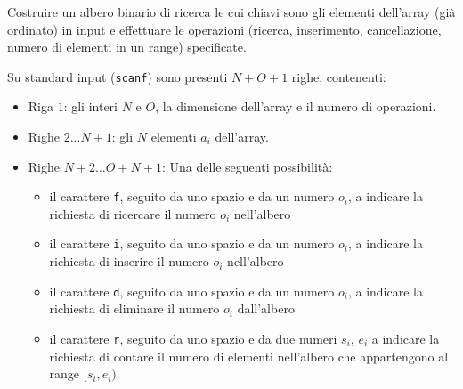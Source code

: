 \usepackage{xcolor}
\usepackage{afterpage}
\usepackage{pifont,mdframed}
\usepackage[bottom]{footmisc}


\renewcommand{\inputfile}{\texttt{stdin}}
\renewcommand{\outputfile}{\texttt{stdout}}
\makeatletter
\renewcommand{\this@inputfilename}{\texttt{stdin}}
\renewcommand{\this@outputfilename}{\texttt{stdout}}
\makeatother


\newenvironment{warning}
  {\par\begin{mdframed}[linewidth=2pt,linecolor=gray]%
    \begin{list}{}{\leftmargin=1cm
                   \labelwidth=\leftmargin}\item[\Large\ding{43}]}
  {\end{list}\end{mdframed}\par}


Costruire un albero binario di ricerca le cui chiavi sono gli elementi
dell'array (già ordinato) in input e effettuare le operazioni (ricerca,
inserimento, cancellazione, numero di elementi in un range) specificate.



\InputFile
Su standard input (\texttt{scanf}) sono presenti $N+O+1$ righe, contenenti:
\begin{itemize}[nolistsep,itemsep=2mm]
\item Riga $1$: gli interi $N$ e $O$, la dimensione dell'array e il numero di
    operazioni.
\item Righe $2...N+1$: gli $N$ elementi $a_i$ dell'array.
\item Righe $N+2...O+N+1$: Una delle seguenti possibilità:
    \begin{itemize}
        \item il carattere \texttt{f}, seguito da uno spazio e da
        un numero $o_i$, a indicare la richiesta di ricercare il numero $o_i$
        nell'albero
        \item il carattere \texttt{i}, seguito da uno spazio e da
        un numero $o_i$, a indicare la richiesta di inserire il numero $o_i$
        nell'albero
        \item il carattere \texttt{d}, seguito da uno spazio e da
        un numero $o_i$, a indicare la richiesta di eliminare il numero $o_i$
        dall'albero
        \item il carattere \texttt{r}, seguito da uno spazio e da
        due numeri $s_i$, $e_i$ a indicare la richiesta di contare il numero
        di elementi nell'albero che appartengono al range $[s_i, e_i)$.
    \end{itemize}
\end{itemize}

